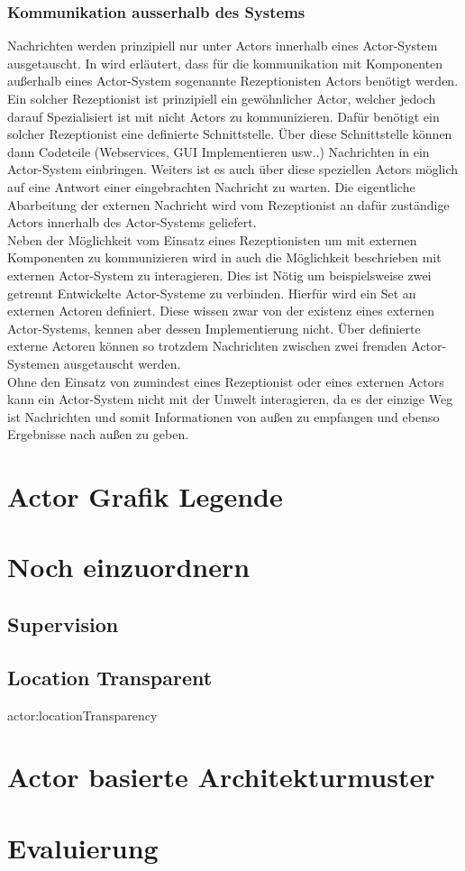 \subsubsection{Kommunikation ausserhalb des Systems}
Nachrichten werden prinzipiell nur unter Actors innerhalb eines Actor-System ausgetauscht. In \cite{Agha1985ActorsSystems} wird erläutert, dass für die kommunikation mit Komponenten außerhalb eines Actor-System sogenannte Rezeptionisten Actors benötigt werden.\\
Ein solcher Rezeptionist ist prinzipiell ein gewöhnlicher Actor, welcher jedoch darauf Spezialisiert ist mit nicht Actors zu kommunizieren. Dafür benötigt ein solcher Rezeptionist eine definierte Schnittstelle. Über diese Schnittstelle können dann Codeteile (Webservices, GUI Implementieren usw..) Nachrichten in ein Actor-System einbringen. Weiters ist es auch über diese speziellen Actors möglich auf eine Antwort einer eingebrachten Nachricht zu warten. Die eigentliche Abarbeitung der externen Nachricht wird vom Rezeptionist an dafür zuständige Actors innerhalb des Actor-Systems geliefert.\citep{Agha1985ActorsSystems}\\
Neben der Möglichkeit vom Einsatz eines Rezeptionisten um mit externen Komponenten zu kommunizieren wird in \cite{Agha1985ActorsSystems} auch die Möglichkeit beschrieben mit externen Actor-System zu interagieren. Dies ist Nötig um beispielsweise zwei getrennt Entwickelte Actor-Systeme zu verbinden. Hierfür wird ein Set an externen Actoren definiert. Diese wissen zwar von der existenz eines externen Actor-Systems, kennen aber dessen Implementierung nicht. Über definierte externe Actoren können so trotzdem Nachrichten zwischen zwei fremden Actor-Systemen ausgetauscht werden. \\
Ohne den Einsatz von zumindest eines Rezeptionist oder eines externen Actors kann ein Actor-System nicht mit der Umwelt interagieren, da es der einzige Weg ist Nachrichten und somit Informationen von außen zu empfangen und ebenso Ergebnisse nach außen zu geben. 

\section{Actor Grafik Legende}

\section{Noch einzuordnern}
\subsection{Supervision}\label{actor:supervision}
\subsection{Location Transparent}{actor:locationTransparency}
\section{Actor basierte Architekturmuster}
\label{theory:actorArchitecture}
\section{Evaluierung}
